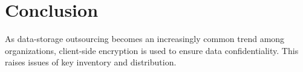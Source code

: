 \documentclass[hyp,a4paper,12pt,openbib]{socreport}
\begin{document}
%
%
%
%
%
%
%


\chapter{Conclusion}

As data-storage outsourcing becomes an increasingly common trend among organizations, client-side encryption is used to ensure data confidentiality. This raises issues of key inventory and distribution.
\end{document}
